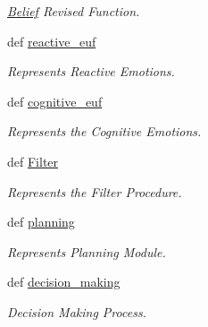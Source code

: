 \begin{DoxyCompactItemize}
\begin{DoxyCompactList}\small\item\em \hyperlink{classdrama__filter_1_1code_1_1Belief}{Belief} Revised Function. \end{DoxyCompactList}\item 
def \hyperlink{classdrama__filter_1_1code_1_1ADA_a03168ea11a1b6f525bdcabb21f92a06c}{reactive\_\-euf}
\begin{DoxyCompactList}\small\item\em Represents Reactive Emotions. \end{DoxyCompactList}\item 
def \hyperlink{classdrama__filter_1_1code_1_1ADA_a20a26f3a848d3dfd1715f9789b778ee0}{cognitive\_\-euf}
\begin{DoxyCompactList}\small\item\em Represents the Cognitive Emotions. \end{DoxyCompactList}\item 
def \hyperlink{classdrama__filter_1_1code_1_1ADA_a1f378f47edd14177b76d3562a9e030a9}{Filter}
\begin{DoxyCompactList}\small\item\em Represents the Filter Procedure. \end{DoxyCompactList}\item 
def \hyperlink{classdrama__filter_1_1code_1_1ADA_a42c27e41a12a70a8765d0410ac241215}{planning}
\begin{DoxyCompactList}\small\item\em Represents Planning Module. \end{DoxyCompactList}\item 
\hypertarget{classdrama__filter_1_1code_1_1ADA_a9729845a588685d2cc9dc43229f4b3ba}{
def \hyperlink{classdrama__filter_1_1code_1_1ADA_a9729845a588685d2cc9dc43229f4b3ba}{decision\_\-making}}
\label{classdrama__filter_1_1code_1_1ADA_a9729845a588685d2cc9dc43229f4b3ba}

\begin{DoxyCompactList}\small\item\em Decision Making Process. \end{DoxyCompactList}\end{DoxyCompactItemize}
